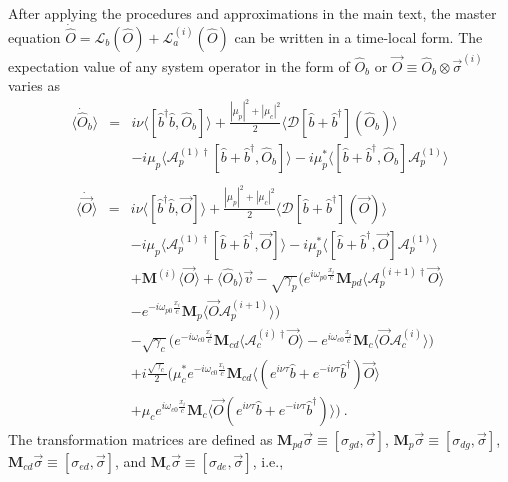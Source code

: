 \documentclass[aps, pra, reprint, amsmath, amssymb, groupedaddress, acknowledgments]{revtex4-1}
\begin{document}
After applying the procedures and approximations in the main text, the master equation $\dot{\hat{O}}=\mathcal{L}_b(\hat{O})+\mathcal{L}^{(i)}_a(\hat{O})$ can be written in a time-local form.  The expectation value of any system operator in the form of $\hat{O}_b$ or $\vec{O}\equiv \hat{O}_b \otimes \vec{\sigma}^{(i)}$ varies as
\begin{eqnarray}\label{eq:mean_Ob}
\langle \dot{\hat{O}}_b \rangle &=&i \nu \langle[\hat{b}^\dag \hat{b}, \hat{O}_b]\rangle +\frac{|\mu_p|^2+|\mu_c|^2}{2}\langle \mathcal{D}[\hat{b}+\hat{b}^\dag](\hat{O}_b)\rangle \nonumber \\ &&- i\mu_p \langle \mathcal{A}_p^{(1)\dag} [\hat{b}+\hat{b}^\dag,\hat{O}_b] \rangle - i\mu_p^\ast \langle [\hat{b}+\hat{b}^\dag,\hat{O}_b] \mathcal{A}_p^{(1)}\rangle \nonumber \\
\end{eqnarray}
\begin{eqnarray}
\langle\dot{\vec{O}}\rangle &=& i \nu \langle[\hat{b}^\dag \hat{b}, \vec{O}]\rangle +\frac{|\mu_p|^2+|\mu_c|^2}{2}\langle \mathcal{D}[\hat{b}+\hat{b}^\dag](\vec{O})\rangle \nonumber \\
&&- i\mu_p \langle \mathcal{A}_p^{(1)\dag} [\hat{b}+\hat{b}^\dag,\vec{O}] \rangle - i\mu_p^\ast \langle [\hat{b}+\hat{b}^\dag,\vec{O}] \mathcal{A}_p^{(1)}\rangle \nonumber \\
&&+\mathbf{M}^{(i)}\langle \vec{O}\rangle + \langle\hat{O}_b\rangle \vec{v} - \sqrt{\gamma_p}  \Big( e^{i\omega_{p0} \frac{x_i}{c}} \mathbf{M}_{pd}\langle\mathcal{A}_p^{(i+1)\dag} \vec{O} \rangle\nonumber \\
&& -e^{-i\omega_{p0} \frac{x_i}{c}} \mathbf{M}_p \langle \vec{O} \mathcal{A}_p^{(i+1)}\rangle \Big) \nonumber \\
&&- \sqrt{\gamma_c} \Big( e^{-i\omega_{c0} \frac{x_i}{c}} \mathbf{M}_{cd} \langle\mathcal{A}_c^{(i)\dag} \vec{O}\rangle -e^{i\omega_{c0} \frac{x_i}{c}} \mathbf{M}_c \langle \vec{O} \mathcal{A}_c^{(i)}\rangle \Big) \nonumber \\
&&+ i\frac{\sqrt{\gamma_c}}{2}\big(\mu_c^\ast e^{-i\omega_{c0} \frac{x_i}{c}}\mathbf{M}_{cd}\langle(e^{i\nu\tau}\hat{b} + e^{-i\nu\tau}\hat{b}^\dag) \vec{O}\rangle \nonumber \\
&&+ \mu_c e^{i\omega_{c0} \frac{x_i}{c}} \mathbf{M}_c\langle \vec{O} (e^{i\nu\tau}\hat{b}+e^{-i\nu\tau}\hat{b}^\dag)\rangle \big)  ~. \label{eq:mean_Ov}
\end{eqnarray}
The transformation matrices are defined as $\mathbf{M}_{pd}\vec{\sigma}\equiv [\sigma_{gd},\vec{\sigma}]$, $\mathbf{M}_{p}\vec{\sigma}\equiv [\sigma_{dg},\vec{\sigma}]$, $\mathbf{M}_{cd}\vec{\sigma}\equiv [\sigma_{ed},\vec{\sigma}]$, and $\mathbf{M}_{c}\vec{\sigma}\equiv [\sigma_{de},\vec{\sigma}]$, i.e.,
\end{document}
